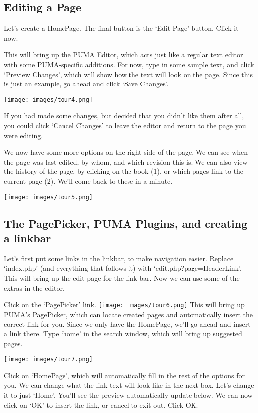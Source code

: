 \documentclass[12pt]{article}
\begin{document}
\subsection*{Editing a Page}


 Let's create a HomePage. The final button is the `Edit Page' button. Click it now.


 This will bring up the PUMA Editor, which acts just like a regular text editor with some PUMA-specific additions. For now, type in some sample text, and click `Preview Changes', which will show how the text will look on the page. Since this is just an example, go ahead and click `Save Changes'.

\texttt{[image: images/tour4.png]} 

 If you had made some changes, but decided that you didn't like them after all, you could click `Cancel Changes' to leave the editor and return to the page you were editing.


 We now have some more options on the right side of the page. We can see when the page was last edited, by whom, and which revision this is. We can also view the history of the page, by clicking on the book (1), or which pages link to the current page (2). We'll come back to these in a minute.

\texttt{[image: images/tour5.png]} 

\subsection*{The PagePicker, PUMA Plugins, and creating a linkbar}


 Let's first put some links in the linkbar, to make navigation easier. Replace `index.php' (and everything that follows it) with `edit.php?page=HeaderLink'. This will bring up the edit page for the link bar. Now we can use some of the extras in the editor.


 Click on the `PagePicker' link. \texttt{[image: images/tour6.png]}  This will bring up PUMA's PagePicker, which can locate created pages and automatically insert the correct link for you. Since we only have the HomePage, we'll go ahead and insert a link there. Type `home' in the search window, which will bring up suggested pages.

\texttt{[image: images/tour7.png]} 

 Click on `HomePage', which will automatically fill in the rest of the options for you. We can change what the link text will look like in the next box. Let's change it to just `Home'. You'll see the preview automatically update below. We can now click on `OK' to insert the link, or cancel to exit out. Click OK.
\end{document}
